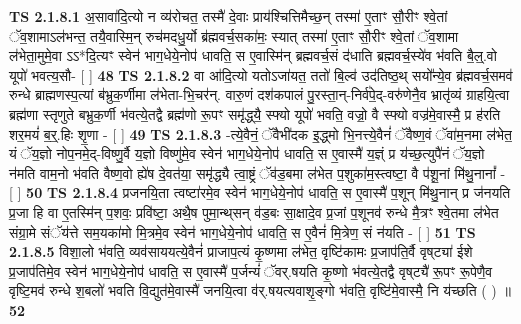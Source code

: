 \documentclass[17pt]{extarticle}
\begin{document}
                                        \textbf{ TS 2.1.8.1} \newline
                  अ॒सावा॑दि॒त्यो न व्य॑रोचत॒ तस्मै॑ दे॒वाः प्राय॑श्चित्तिमैच्छ॒न् तस्मा॑ ए॒ताꣳ सौ॒रीꣳ श्वे॒तां ॅव॒शामाऽल॑भन्त॒ तयै॒वास्मि॒न् रुच॑मदधु॒र्यो ब्र॑ह्मवर्च॒सका॑मः॒ स्यात् तस्मा॑ ए॒ताꣳ सौ॒रीꣳ श्वे॒तां ॅव॒शामा ल॑भेता॒मुमे॒वा ऽऽ*दि॒त्यꣳ स्वेन॑ भाग॒धेये॒नोप॑ धावति॒ स ए॒वास्मि॑न् ब्रह्मवर्च॒सं द॑धाति ब्रह्मवर्च॒स्ये॑व भ॑वति बै॒ल्॒.वो यूपो॑ भवत्य॒सौ-  [  ] \textbf{  48} \newline
                  \newline
                                \textbf{ TS 2.1.8.2} \newline
                  वा आ॑दि॒त्यो यतोऽजा॑यत॒ ततो॑ बि॒ल्व॑ उद॑तिष्ठ॒थ् सयो᳚न्ये॒व ब्र॑ह्मवर्च॒समव॑ रुन्धे ब्राह्मणस्प॒त्यां ब॑भ्रुक॒र्णीमा ल॑भेता-भि॒चर॑न्. वारु॒णं दश॑कपालं पु॒रस्ता॒न्-निर्व॑पे॒द्-वरु॑णेनै॒व भ्रातृ॑व्यं ग्राहयि॒त्वा ब्रह्म॑णा स्तृणुते बभ्रुक॒र्णी भ॑वत्ये॒तद्वै ब्रह्म॑णो रू॒पꣳ समृ॑द्ध्‌यै॒ स्फ्यो यूपो॑ भवति॒ वज्रो॒ वै स्फ्यो वज्र॑मे॒वास्मै॒ प्र ह॑रति शर॒मयं॑ ब॒र्॒.हिः शृ॒णा - [  ] \textbf{  49} \newline
                  \newline
                                \textbf{ TS 2.1.8.3} \newline
                  -त्ये॒वैनं॒ ॅवैभी॑दक इ॒द्ध्मो भि॒नत्त्ये॒वैनं॑ ॅवैष्ण॒वं ॅवा॑म॒नमा ल॑भेत॒ यं ॅय॒ज्ञो नोप॒नमे॒द्-विष्णु॒र्वै य॒ज्ञो विष्णु॑मे॒व स्वेन॑ भाग॒धेये॒नोप॑ धावति॒ स ए॒वास्मै॑ य॒ज्ञ्ं प्र य॑च्छ॒त्युपै॑नं ॅय॒ज्ञो न॑मति वाम॒नो भ॑वति वैष्ण॒वो ह्ये॑ष दे॒वत॑या॒ समृ॑द्ध्यै त्वा॒ष्ट्रं ॅव॑ड॒बमा ल॑भेत प॒शुका॑म॒स्त्वष्टा॒ वै प॑शू॒नां मि॑थु॒नानां᳚ - [  ] \textbf{  50} \newline
                  \newline
                                \textbf{ TS 2.1.8.4} \newline
                  प्रजनयि॒ता त्वष्टा॑रमे॒व स्वेन॑ भाग॒धेये॒नोप॑ धावति॒ स ए॒वास्मै॑ प॒शून् मि॑थु॒नान् प्र ज॑नयति प्र॒जा हि वा ए॒तस्मि॑न् प॒शवः॒ प्रवि॑ष्टा॒ अथै॒ष पुमा॒न्थ्‌सन् व॑ड॒बः सा॒क्षादे॒व प्र॒जां प॒शूनव॑ रुन्धे मै॒त्रꣳ श्वे॒तमा ल॑भेत संग्रा॒मे संॅय॑त्ते सम॒यका॑मो मि॒त्रमे॒व स्वेन॑ भाग॒धेये॒नोप॑ धावति॒ स ए॒वैनं॑ मि॒त्रेण॒ सं न॑यति - [  ] \textbf{  51} \newline
                  \newline
                                \textbf{ TS 2.1.8.5} \newline
                  विशा॒लो भ॑वति॒ व्यव॑साययत्ये॒वैनं॑ प्राजाप॒त्यं कृ॒ष्णमा ल॑भेत॒ वृष्टि॑कामः प्र॒जाप॑ति॒र्वै वृष्‌ट्या॑ ईशे प्र॒जाप॑तिमे॒व स्वेन॑ भाग॒धेये॒नोप॑ धावति॒ स ए॒वास्मै॑ प॒र्जन्यं॑ ॅवर्.षयति कृ॒ष्णो भ॑वत्ये॒तद्वै वृष्‌ट्यै॑ रू॒पꣳ रू॒पेणै॒व वृष्टि॒मव॑ रुन्धे श॒बलो॑ भवति वि॒द्युत॑मे॒वास्मै॑ जनयि॒त्वा व॑र्.षयत्यवाशृ॒ङ्गो भ॑वति॒ वृष्टि॑मे॒वास्मै॒ नि य॑च्छति ( ) ॥ \textbf{  52} \newline
\end{document}
